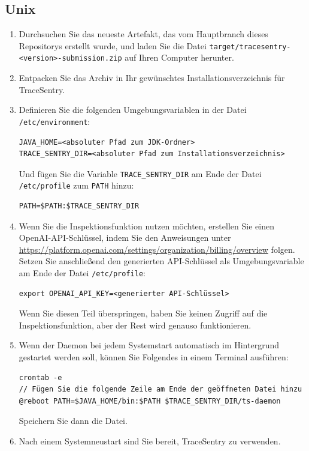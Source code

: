 \documentclass[a4paper,12pt]{report}
\begin{document}
    \subsection{Unix}
    \begin{enumerate}
        \item Durchsuchen Sie das neueste Artefakt, das vom Hauptbranch dieses Repositorys erstellt wurde, und laden Sie die Datei
        \texttt{target/tracesentry-\textless{}version\textgreater{}-submission.zip} auf Ihren Computer herunter.
        \item Entpacken Sie das Archiv in Ihr gewünschtes Installationsverzeichnis für TraceSentry.
        \item Definieren Sie die folgenden Umgebungsvariablen in der Datei \texttt{/etc/environment}:
        \begin{lstlisting}[label={lst:lstlisting-unix-1}]
JAVA_HOME=<absoluter Pfad zum JDK-Ordner>
TRACE_SENTRY_DIR=<absoluter Pfad zum Installationsverzeichnis>
        \end{lstlisting}
        Und fügen Sie die Variable \texttt{TRACE\_SENTRY\_DIR} am Ende der Datei \texttt{/etc/profile} zum \texttt{PATH} hinzu:
        \begin{lstlisting}[label={lst:lstlisting-unix-2}]
PATH=$PATH:$TRACE_SENTRY_DIR
        \end{lstlisting}
        \item Wenn Sie die Inspektionsfunktion nutzen möchten, erstellen Sie einen OpenAI-API-Schlüssel, indem Sie den Anweisungen unter \url{https://platform.openai.com/settings/organization/billing/overview} folgen.
        Setzen Sie anschließend den generierten API-Schlüssel als Umgebungsvariable am Ende der Datei \texttt{/etc/profile}:
        \begin{lstlisting}[label={lst:lstlisting-unix-3}]
export OPENAI_API_KEY=<generierter API-Schlüssel>
        \end{lstlisting}
        Wenn Sie diesen Teil überspringen, haben Sie keinen Zugriff auf die Inspektionsfunktion, aber der Rest wird genauso funktionieren.
        \item Wenn der Daemon bei jedem Systemstart automatisch im Hintergrund gestartet werden soll, können Sie Folgendes in einem Terminal ausführen:
        \begin{lstlisting}[label={lst:lstlisting-unix-4}]
crontab -e
// Fügen Sie die folgende Zeile am Ende der geöffneten Datei hinzu
@reboot PATH=$JAVA_HOME/bin:$PATH $TRACE_SENTRY_DIR/ts-daemon
        \end{lstlisting}
        Speichern Sie dann die Datei.
        \item Nach einem Systemneustart sind Sie bereit, TraceSentry zu verwenden.
    \end{enumerate}
\end{document}
